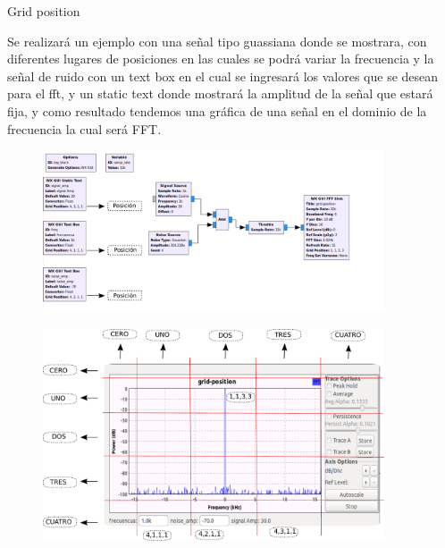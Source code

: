 \begin{frame}{Grid position}

Se realizará un ejemplo con una señal tipo guassiana donde se mostrara, con diferentes lugares de posiciones en las cuales se podrá variar la frecuencia y la señal de ruido con un text box en el cual se ingresará los valores que se desean para el fft, y un static text donde mostrará la amplitud de la señal que estará fija, y como resultado tendemos una gráfica de una señal en el dominio de la frecuencia la cual será FFT.

\end{frame}

\begin{frame}{}

\begin{figure}[H]
\centering
\vspace{-3mm}
\includegraphics[width=0.9\textwidth]{parte1/lab2-2/pdf/lab0_4.pdf}
\end{figure}

\end{frame}
\begin{frame}{}

\begin{figure}[H]
\centering
\vspace{-3mm}
\includegraphics[width=0.9\textwidth]{parte1/lab2-2/pdf/lab0_5.pdf}
\end{figure}

\end{frame}
